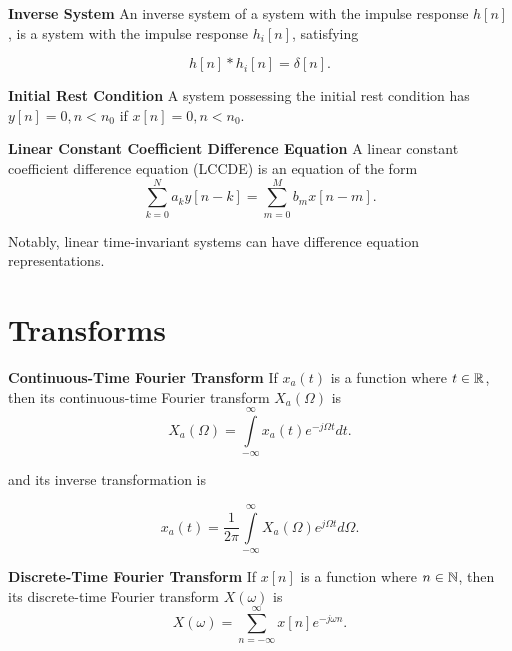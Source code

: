 \begin{defn}{\textbf{Inverse System}}
    An inverse system of a system with the impulse response $h[n]$, is a system with the impulse response $h_i[n]$, satisfying

    \begin{equation}
        h[n] * h_i[n] = \delta [n].
    \end{equation}
\end{defn}

\begin{defn}{\textbf{Initial Rest Condition}}
    A system possessing the initial rest condition has $y[n] =0, n < n_0$ if $x[n]=0, n < n_0$.
\end{defn}

\begin{defn}{\textbf{Linear Constant Coefficient Difference Equation}}
    A linear constant coefficient difference equation (LCCDE) is an equation of the form 
    \begin{equation}
        \sum\limits_{k=0}^{N} a_k y[n-k] = \sum\limits_{m=0}^{M} b_m x[n-m].
    \end{equation}

    Notably, linear time-invariant systems can have difference equation representations. 
\end{defn}

\section{Transforms}

\begin{defn}{\textbf{Continuous-Time Fourier Transform}}
If $x_a(t)$ is a function where $t \in \mathbb{R}$, then its continuous-time Fourier transform $X_a(\Omega)$ is 
\begin{equation}
X_a(\Omega) = \int\limits_{ - \infty }^\infty  {{x_a}(t){e^{ - j\Omega t}}dt}.
\end{equation}

and its inverse transformation is

\begin{equation}
{x_a}\left( t \right) = \frac{1}{{2\pi }}\int\limits_{ - \infty }^\infty  {{X_a}(\Omega ){e^{ j\Omega t}}d\Omega }. 
\end{equation}
\end{defn}

\begin{defn}{\textbf{Discrete-Time Fourier Transform}}
If $x[n]$ is a function where $n \in \mathbb{N}$, then its discrete-time Fourier transform $X(\omega)$ is 
\begin{equation}
X(\omega) = \sum\limits_{n =  - \infty }^\infty  {x[n]{e^{ - j\omega n}}}. 
\end{equation}
\end{defn}

